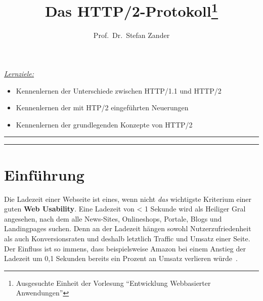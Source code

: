 \documentclass[a4paper, justified, notoc]{tufte-handout} %
\title{Das HTTP/2-Protokoll\thanks{Ausgesuchte Einheit der Vorlesung ``Entwicklung Webbasierter Anwendungen''}}
\author[opt Author]{Prof.\ Dr.\ Stefan Zander}
\newenvironment{lernziele}{
	\begin{mdframed}[hidealllines=true,backgroundcolor=gray!20] 
	\small \itshape
	\noindent \underline{Lernziele:} 
	} 
	{ 
	\end{mdframed}
}
\begin{document}
\maketitle%


\begin{lernziele}
\begin{itemize}
	\item Kennenlernen der Unterschiede zwischen HTTP/1.1 und HTTP/2
	\item Kennenlernen der mit HTP/2 eingeführten Neuerungen 
	\item Kennenlernen der grundlegenden Konzepte von HTTP/2
\end{itemize}
\end{lernziele}


\setcounter{secnumdepth}{2} %

\noindent \rule{1.54\textwidth}{0.4pt}
\tableofcontents
\noindent \rule{1.54\textwidth}{0.4pt}

\section{Einführung}\label{sec:introduction}

Die Ladezeit einer Webseite ist eines, wenn nicht \emph{das} wichtigste Kriterium einer guten \textbf{Web Usability}. Eine Ladezeit von < 1 Sekunde wird als Heiliger Gral angesehen, nach dem alle News-Sites, Onlineshops, Portale, Blogs und Landingpages suchen. Denn an der Ladezeit hängen sowohl Nutzerzufriedenheit als auch Konversionsraten und deshalb letztlich Traffic und Umsatz einer Seite. Der Einfluss ist so immens, dass beispielsweise Amazon bei einem Anstieg der Ladezeit um 0,1 Sekunden bereits ein Prozent an Umsatz verlieren würde~\citep{heise:2018}.
\end{document}

